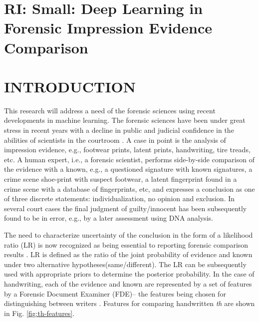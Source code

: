 \documentclass[11pt, doublespacing]{article}
\begin{document}
\section*{RI: Small: Deep Learning in Forensic Impression Evidence Comparison}
\vspace{0.5in}
\section{INTRODUCTION}

This research will address a need of the forensic sciences using recent developments in machine learning. The forensic sciences have been under great stress in recent years with a  decline in public and judicial confidence  in the abilities of scientists in the courtroom \cite{NAS09, Daeid2015}. A case in point is the analysis of impression evidence, e.g., footwear prints, latent prints, handwriting, tire treads, etc. 
A  human expert, i.e., a forensic scientist,  performs side-by-side comparison of the evidence with a known, e.g., a questioned signature with known signatures, a crime scene shoe-print with suspect footwear, a latent fingerprint found in a crime scene with a database of  fingerprints, etc, and expresses a conclusion as one of three discrete statements: individualization, no opinion and exclusion. In  several court cases  the final  judgment of guilty/innocent has been subsequently found to be in error, e.g., by a later assessment using DNA analysis.   

The need to characterize uncertainty of the conclusion in the form of a likelihood ratio (LR)  is now recognized as being essential to reporting forensic comparison results \cite{Neumann2007,Srihari2008,Taylor12}. LR is defined as the ratio of the joint probability of evidence and known under two alternative hypotheses(same/different). The LR can be subsequently used with appropriate priors to determine the posterior probability. In the case of handwriting, each of the evidence and known are represented by  a set of features by a Forensic Document Examiner (FDE)-- the features being chosen for  distinguishing between writers  \cite{Muehlberger1977}.   Features for comparing handwritten {\em th} are shown in Fig. \ref{fig:th-features}. 
\end{document}
